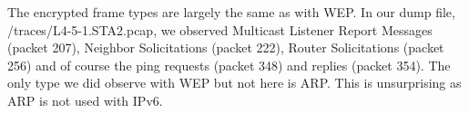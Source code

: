 The encrypted frame types are largely the same as with WEP. In our dump file, /traces/L4-5-1.STA2.pcap, we observed Multicast Listener Report Messages (packet 207), Neighbor Solicitations (packet 222), Router Solicitations (packet 256) and of course the ping requests (packet 348) and replies (packet 354). The only type we did observe with WEP but not here is ARP. This is unsurprising as ARP is not used with IPv6.
